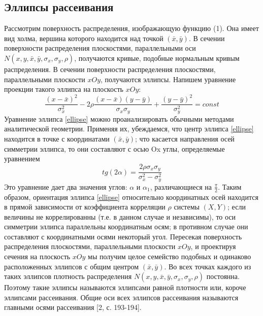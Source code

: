 \documentclass[a4paper,14pt]{article}
\begin{document}
	\subsection{Эллипсы рассеивания}
	\noindent Рассмотрим поверхность распределения, изображающую функцию (1). Она имеет вид холма, вершина которого находится над точкой $(\bar{x},\bar{y})$.
	\newline
	В сечении поверхности распределения плоскостями, параллельными оси $ N(x, y, \bar{x}, \bar{y}, \sigma_{x}, \sigma_{y}, \rho)$, получаются кривые, подобные нормальным кривым распределения. В сечении поверхности распределения плоскостями, параллельными плоскости $xOy$, получаются эллипсы. Напишем уравнение проекции такого эллипса на плоскость $xOy$: 
	\begin{equation}
		\frac{(x-\bar{x})^{2}}{\sigma_{x}^{2}} - 
		2\rho\frac{(x-\bar{x})(y-\bar{y})}{\sigma_{x}\sigma_{y}}+
		\frac{(y-\bar{y})^{2}}{\sigma_{y}^{2}} = const
		\label{ellipse}
	\end{equation}
	Уравнение эллипса \ref{ellipse} можно проанализировать обычными методами аналитической геометрии. Применяя их, убеждаемся, что центр эллипса \ref{ellipse} находится в точке с координатами $(\bar{x},\bar{y})$; что касается направления осей симметрии эллипса, то они составляют с осью Ox углы, определяемые уравнением
	\begin{equation}
		tg(2\alpha) = \frac{2\rho\sigma_{x}\sigma_{y}}{\sigma_{x}^{2} - \sigma_{y}^{2}}
		\label{angle}
	\end{equation}
	Это уравнение дает два значения углов: $\alpha$ и $\alpha_{1}$, различающиеся на $\frac{\pi}{2}$.
	\newline
	Таким образом, ориентация эллипса \ref{ellipse} относительно координатных осей находится в прямой зависимости от коэффициента корреляции $\rho$ системы $(X,Y)$; если величины не коррелированны (т.е. в данном случае и независимы), то оси симметрии эллипса параллельны координатным осям; в противном случае они составляют с координатными осями некоторый угол.
	\newline
	Пересекая поверхность распределения плоскостями, параллельными плоскости $xOy$, и проектируя сечения на плоскость $xOy$ мы получим целое семейство подобных и одинаково расположенных эллипсов с общим центром $(\bar{x},\bar{y})$. Во всех точках каждого из таких эллипсов плотность распределения $ N(x, y, \bar{x}, \bar{y}, \sigma_{x}, \sigma_{y}, \rho)$ постоянна. Поэтому такие эллипсы называются эллипсами равной плотности или, короче эллипсами рассеивания. Общие оси всех эллипсов рассеивания называются главными осями рассеивания [2, с. 193-194].
\end{document}

